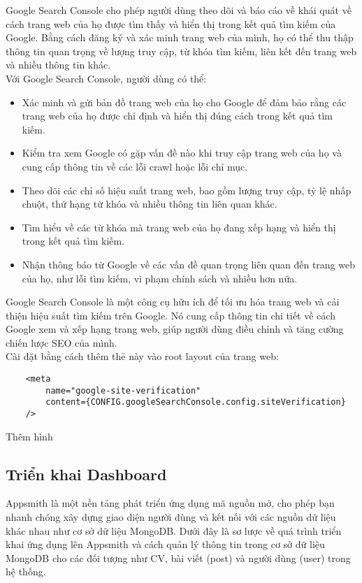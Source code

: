 Google Search Console cho phép người dùng theo dõi và báo cáo về khái quát về cách trang web của họ được tìm thấy và hiển thị trong kết quả tìm kiếm của Google. Bằng cách đăng ký và xác minh trang web của mình, họ có thể thu thập thông tin quan trọng về lượng truy cập, từ khóa tìm kiếm, liên kết đến trang web và nhiều thông tin khác.\\

Với Google Search Console, người dùng có thể:
\begin{itemize}
    \item Xác minh và gửi bản đồ trang web của họ cho Google để đảm bảo rằng các trang web của họ được chỉ định và hiển thị đúng cách trong kết quả tìm kiếm.
    \item Kiểm tra xem Google có gặp vấn đề nào khi truy cập trang web của họ và cung cấp thông tin về các lỗi crawl hoặc lỗi chỉ mục.
    \item Theo dõi các chỉ số hiệu suất trang web, bao gồm lượng truy cập, tỷ lệ nhấp chuột, thứ hạng từ khóa và nhiều thông tin liên quan khác.
    \item Tìm hiểu về các từ khóa mà trang web của họ đang xếp hạng và hiển thị trong kết quả tìm kiếm.
    \item Nhận thông báo từ Google về các vấn đề quan trọng liên quan đến trang web của họ, như lỗi tìm kiếm, vi phạm chính sách và nhiều hơn nữa.
\end{itemize}
Google Search Console là một công cụ hữu ích để tối ưu hóa trang web và cải thiện hiệu suất tìm kiếm trên Google. Nó cung cấp thông tin chi tiết về cách Google xem và xếp hạng trang web, giúp người dùng điều chỉnh và tăng cường chiến lược SEO của mình.\\

Cài đặt bằng cách thêm thẻ này vào root layout của trang web:
\begin{lstlisting}
    <meta
        name="google-site-verification"
        content={CONFIG.googleSearchConsole.config.siteVerification}
    />
\end{lstlisting}

Thêm hình

\subsection{Triển khai Dashboard}
Appsmith là một nền tảng phát triển ứng dụng mã nguồn mở, cho phép bạn nhanh chóng xây dựng giao diện người dùng và kết nối với các nguồn dữ liệu khác nhau như cơ sở dữ liệu MongoDB. Dưới đây là sơ lược về quá trình triển khai ứng dụng lên Appsmith và cách quản lý thông tin trong cơ sở dữ liệu MongoDB cho các đối tượng như CV, bài viết (post) và người dùng (user) trong hệ thống.

